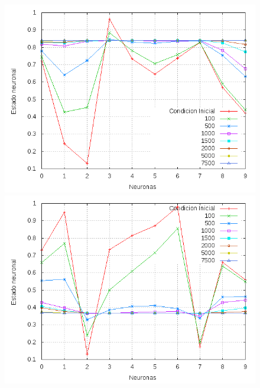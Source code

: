 \documentclass[aps,prb,onecolumn,10pt,floatfix,superscriptaddress]{article} %
\begin{document}
\begin{figure}[!htd]
   	\begin{minipage}[b]{0.450\linewidth}
      	    \begin{center}
   	    \includegraphics[scale=0.32 ]{sigma1_1.png}
     	    \end{center}
   \end{minipage}
   \begin{minipage}[b]{0.450\linewidth}
      	     \begin{center}
   	    \includegraphics[scale=0.32 ]{sigma1_2.png}
     	    \end{center}
   \end{minipage}    
   
 \end{figure}
\end{document}

